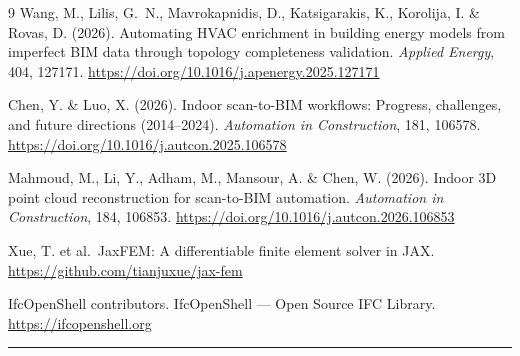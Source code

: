 \documentclass[a4paper,11pt]{article}
\begin{document}
\begin{thebibliography}{9}
Wang, M., Lilis, G.~N., Mavrokapnidis, D., Katsigarakis, K., Korolija, I. \& Rovas, D. (2026).
Automating HVAC enrichment in building energy models from imperfect BIM data through topology completeness validation.
\textit{Applied Energy}, 404, 127171.
\url{https://doi.org/10.1016/j.apenergy.2025.127171}

Chen, Y. \& Luo, X. (2026).
Indoor scan-to-BIM workflows: Progress, challenges, and future directions (2014--2024).
\textit{Automation in Construction}, 181, 106578.
\url{https://doi.org/10.1016/j.autcon.2025.106578}

Mahmoud, M., Li, Y., Adham, M., Mansour, A. \& Chen, W. (2026).
Indoor 3D point cloud reconstruction for scan-to-BIM automation.
\textit{Automation in Construction}, 184, 106853.
\url{https://doi.org/10.1016/j.autcon.2026.106853}

Xue, T. et al.\ JaxFEM: A differentiable finite element solver in JAX.
\url{https://github.com/tianjuxue/jax-fem}

IfcOpenShell contributors.
IfcOpenShell --- Open Source IFC Library.
\url{https://ifcopenshell.org}

\end{thebibliography}

\vfill
\noindent\rule{\linewidth}{0.4pt}
\end{document}
